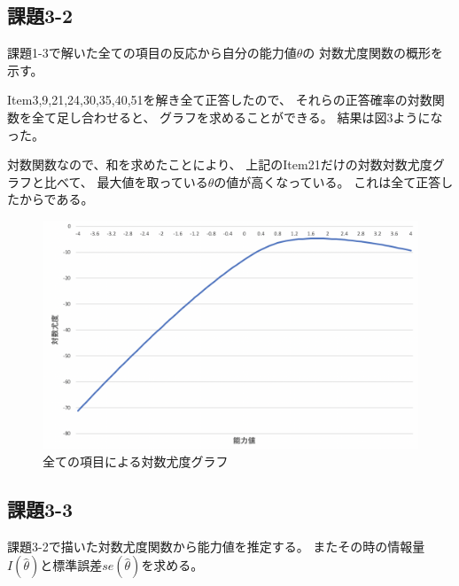 \documentclass[12pt]{jarticle}
\begin{document}
\subsection{課題3-2}
\begin{shadebox}
    課題1-3で解いた全ての項目の反応から自分の能力値$\theta$の
    対数尤度関数の概形を示す。
\end{shadebox}

Item3,9,21,24,30,35,40,51を解き全て正答したので、
それらの正答確率の対数関数を全て足し合わせると、
グラフを求めることができる。
結果は図3ようになった。

対数関数なので、和を求めたことにより、
上記のItem21だけの対数対数尤度グラフと比べて、
最大値を取っている$\theta$の値が高くなっている。
これは全て正答したからである。

\clearpage
\begin{figure}[h]
    \begin{center}
        \includegraphics[scale=0.4]{kadai5_3_3.png}
    \end{center}
    \caption{全ての項目による対数尤度グラフ}
\end{figure}

\subsection{課題3-3}
\begin{shadebox}
    課題3-2で描いた対数尤度関数から能力値を推定する。
    またその時の情報量$I(\hat{\theta})$と標準誤差$se(\hat{\theta})$を求める。
\end{shadebox}
\end{document}
